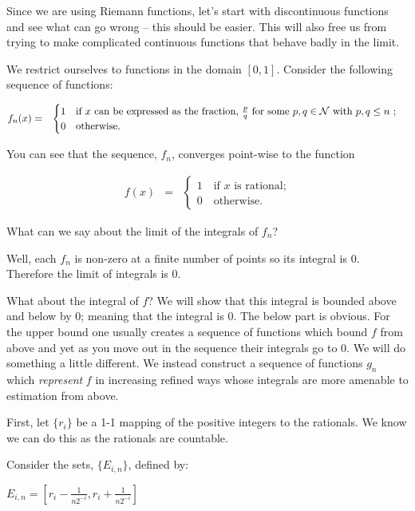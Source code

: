 \documentclass{article}
\begin{document}
Since we are using Riemann functions, 
let's start with discontinuous functions 
and see what can go wrong -- this should be easier. This will also free us from 
trying to make complicated continuous functions that behave badly in the limit.

We restrict ourselves to functions in the domain $[0, 1]$.
Consider the following sequence of functions: 

\begin{eqnarray}
	f_n(x) & = & \begin{cases}  1 \quad \text{if $x$ can be expressed as the fraction, $\frac{p}{q}$ for some $p, q \in {\cal N}$ with $p, q \le n$ ;} \\ 
	  			        		0 \quad \text{otherwise.} 
			   	 \end{cases}
\end{eqnarray}

You can see that the sequence, $f_n$, converges point-wise to the function 

\begin{eqnarray}
	f(x) & = & \begin{cases} 1 \quad \text{if $x$ is rational;} \\ 
			                 0 \quad \text{otherwise.} 
			   \end{cases}
\end{eqnarray}

What can we say about the limit of the integrals of $f_n$?

Well, each $f_n$ is non-zero at a finite number of points so its integral is $0$.
Therefore the limit of integrals is $0$.

What about the integral of $f$? We will show that this integral is bounded above
and below by $0$; meaning that the integral is $0$. The below part is obvious. 
For the upper bound one usually creates a sequence of functions which bound $f$ 
from above and yet as you move out in the sequence their integrals go to $0$.
We will do something a little different. We instead  
construct a sequence of functions $g_n$ which {\em represent\/} $f$ 
in increasing refined ways whose integrals are more amenable to estimation from above.

First, let $\{r_i\}$ be a 1-1 mapping of the positive integers to the rationals.
We know we can do this as the rationals are countable. 

Consider the sets, $\{E_{i,n}\}$, defined by:

$E_{i,n} = \left[r_i - \frac{1}{n 2^{-i}}, r_i + \frac{1}{n 2^{-i}}\right]$
\end{document}
